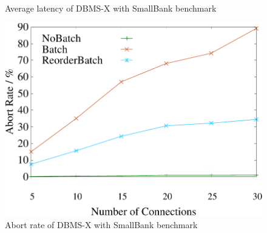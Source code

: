 \begin{figure}[t]
\begin{minipage}[b]{0.31\linewidth}
	\vspace{-2em}
	\caption{Average latency of DBMS-X with SmallBank benchmark}
	\label{fig:hekaton:latency}
	\end{minipage}
\quad
	\begin{minipage}[b]{0.31\linewidth}
	\centering
	\includegraphics[width=\textwidth]{./exp_fig/hekaton/hekaton_abort}
	\vspace{-2em}
	\caption{Abort rate of DBMS-X with SmallBank benchmark}
	\label{fig:hekaton:abort}
	\end{minipage}
\end{figure}

